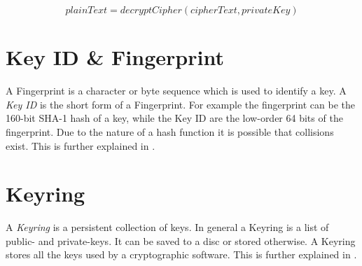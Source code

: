 \begin{equation} \label{eq:pkdecrypt}
	plainText = decryptCipher(cipherText, privateKey)
\end{equation}





\section{Key ID \&{} Fingerprint}
\label{section:pre:keyid}

A Fingerprint is a character or byte sequence which is used to identify a key.
A \textit{Key ID} is the short form of a Fingerprint.
For example the fingerprint can be the 160-bit SHA-1 hash of a key, while the Key ID are the low-order 64 bits of the fingerprint. Due to the nature of a hash function it is possible that collisions exist.
This is further explained in \cite[section 12.2]{RFC4880}.


\section{Keyring}
\label{section:pre:keyring}

A \textit{Keyring} is a persistent collection of keys. 
In general a Keyring is a list of public- and private-keys. It can be saved to a disc or stored otherwise. 
A Keyring stores all the keys used by a cryptographic software.
This is further explained in \cite[section 3.6]{RFC4880}.


